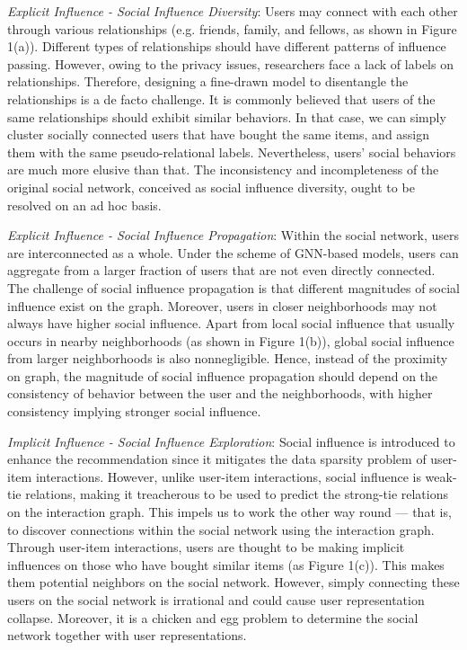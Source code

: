 \documentclass[letterpaper]{article} %
\begin{document}
\textit{Explicit Influence \uppercase\expandafter{} - Social Influence Diversity}: Users may connect with each other through various relationships (e.g. friends, family, and fellows, as shown in Figure 1(a)). Different types of relationships should have different patterns of influence passing. However, owing to the privacy issues, researchers face a lack of labels on relationships. Therefore, designing a fine-drawn model to disentangle the relationships is a de facto challenge. It is commonly believed that users of the same relationships should exhibit similar behaviors. In that case, we can simply cluster socially connected users that have bought the same items, and assign them with the same pseudo-relational labels. Nevertheless, users' social behaviors are much more elusive than that. The inconsistency and incompleteness of the original social network, conceived as social influence diversity, ought to be resolved on an ad hoc basis.

\textit{Explicit Influence \uppercase\expandafter{} - Social Influence Propagation}: Within the social network, users are interconnected as a whole. Under the scheme of GNN-based models, users can aggregate from a larger fraction of users that are not even directly connected. The challenge of social influence propagation is that different magnitudes of social influence exist on the graph. Moreover, users in closer neighborhoods may not always have higher social influence. Apart from local social influence that usually occurs in nearby neighborhoods (as shown in Figure 1(b)), global social influence from larger neighborhoods is also nonnegligible. Hence, instead of the proximity on graph, the magnitude of social influence propagation should depend on the consistency of behavior between the user and the neighborhoods, with higher consistency implying stronger social influence.

\textit{Implicit Influence - Social Influence Exploration}: Social influence is introduced to enhance the recommendation since it mitigates the data sparsity problem of user-item interactions. However, unlike user-item interactions, social influence is weak-tie relations, making it treacherous to be used to predict the strong-tie relations on the interaction graph. This impels us to work the other way round --- that is, to discover connections within the social network using the interaction graph. Through user-item interactions, users are thought to be making implicit influences on those who have bought similar items (as Figure 1(c)). This makes them potential neighbors on the social network. However, simply connecting these users on the social network is irrational and could cause user representation collapse. Moreover, it is a chicken and egg problem to determine the social network together with user representations.
\end{document}
